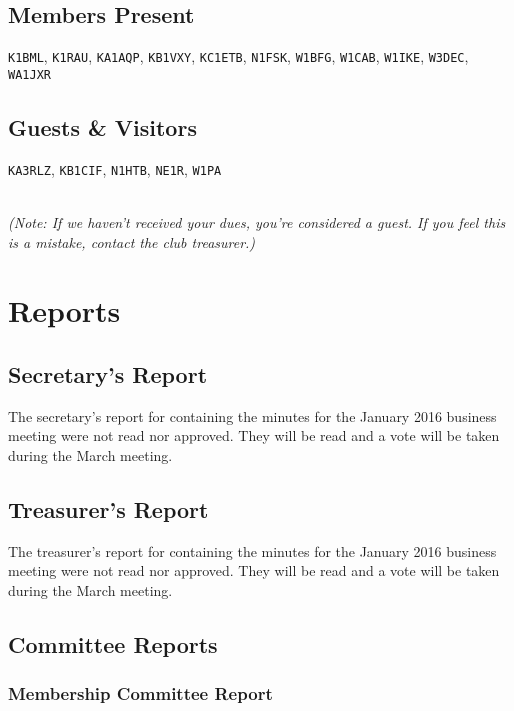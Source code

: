 \documentclass[10pt,letterpaper]{article}
\begin{document}
\subsection{Members Present}

\texttt{K1BML},
\texttt{K1RAU},
\texttt{KA1AQP},
\texttt{KB1VXY},
\texttt{KC1ETB},
\texttt{N1FSK},
\texttt{W1BFG},
\texttt{W1CAB},
\texttt{W1IKE},
\texttt{W3DEC},
\texttt{WA1JXR}

\subsection{Guests \& Visitors}

\texttt{KA3RLZ},
\texttt{KB1CIF},
\texttt{N1HTB},
\texttt{NE1R},
\texttt{W1PA}

\noindent\\
\emph{(Note: If we haven't received your dues, you're considered a guest. If you feel this is a mistake, contact the club treasurer.)}

\section{Reports}

\subsection{Secretary's Report}

The secretary's report for containing the minutes for the January 2016 business meeting were not read nor approved. They will be read and a vote will be taken during the March meeting.

\newpage
\subsection{Treasurer's Report}

The treasurer's report for containing the minutes for the January 2016 business meeting were not read nor approved. They will be read and a vote will be taken during the March meeting.

\subsection{Committee Reports}

\subsubsection{Membership Committee Report}
\end{document}
